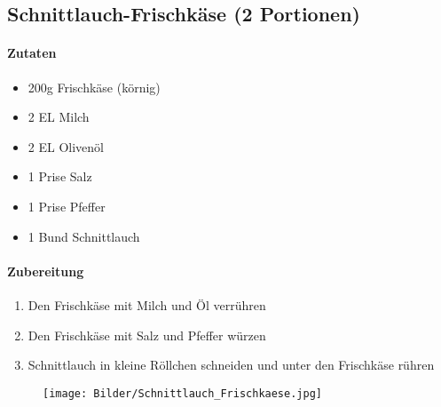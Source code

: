 \newpage
\subsection{Schnittlauch-Frischkäse (2 Portionen)}
\paragraph{Zutaten}
\begin{itemize}[noitemsep, nolistsep]
	\item 200g Frischkäse (körnig)
	\item 2 EL Milch
	\item 2 EL Olivenöl
	\item 1 Prise Salz
	\item 1 Prise Pfeffer
	\item 1 Bund Schnittlauch
\end{itemize}
\paragraph{Zubereitung}
\begin{enumerate}[noitemsep]
	\item Den Frischkäse mit Milch und Öl verrühren
	\item Den Frischkäse mit Salz und Pfeffer würzen
	\item Schnittlauch in kleine Röllchen schneiden und unter den Frischkäse rühren
\end{enumerate}
\begin{figure}[h]
\centering
\texttt{[image: Bilder/Schnittlauch\_Frischkaese.jpg]}
\end{figure}